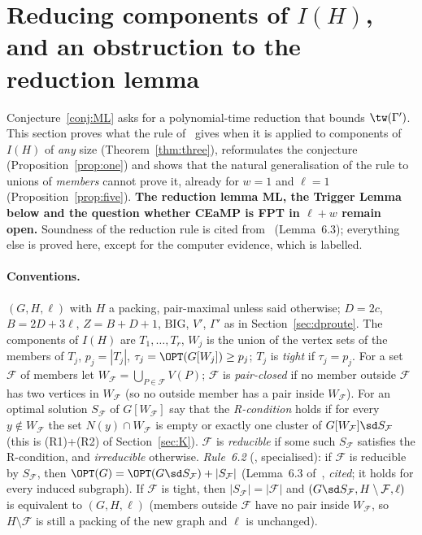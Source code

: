 \section{Reducing components of \texorpdfstring{$I(H)$}{I(H)}, and an obstruction to the reduction lemma}\label{sec:reduction}
Conjecture~\ref{conj:ML} asks for a polynomial-time reduction that bounds $\tw(\Gamma')$. This section proves what the rule of~\cite{BFK18} gives when it is applied to components of $I(H)$ of \emph{any} size (Theorem~\ref{thm:three}), reformulates the conjecture (Proposition~\ref{prop:one}) and shows that the natural generalisation of the rule to unions of \emph{members} cannot prove it, already for $w=1$ and $\ell=1$ (Proposition~\ref{prop:five}). \textbf{The reduction lemma ML, the Trigger Lemma below and the question whether CEaMP is FPT in $\ell+w$ remain open.} Soundness of the reduction rule is cited from~\cite{BFK18} (Lemma~6.3); everything else is proved here, except for the computer evidence, which is labelled.

\paragraph{Conventions.}
$(G,H,\ell)$ with $H$ a packing, pair-maximal unless said otherwise; $D=2c$, $B=2D+3\ell$, $Z=B+D+1$, $\mathrm{BIG}$, $V'$, $\Gamma'$ as in Section~\ref{sec:dproute}. The components of $I(H)$ are $T_1,\dots,T_r$, $W_j$ is the union of the vertex sets of the members of $T_j$, $p_j=|T_j|$, $\tau_j=\OPT(G[W_j])\ge p_j$; $T_j$ is \emph{tight} if $\tau_j=p_j$. For a set $\mathcal F$ of members let $W_{\mathcal F}=\bigcup_{P\in\mathcal F}V(P)$; $\mathcal F$ is \emph{pair-closed} if no member outside $\mathcal F$ has two vertices in $W_{\mathcal F}$ (so no outside member has a pair inside $W_{\mathcal F}$). For an optimal solution $S_{\mathcal F}$ of $G[W_{\mathcal F}]$ say that the \emph{R-condition} holds if for every $y\notin W_{\mathcal F}$ the set $N(y)\cap W_{\mathcal F}$ is empty or exactly one cluster of $G[W_{\mathcal F}]\sd S_{\mathcal F}$ (this is (R1)+(R2) of Section~\ref{sec:K}). $\mathcal F$ is \emph{reducible} if some such $S_{\mathcal F}$ satisfies the R-condition, and \emph{irreducible} otherwise. \emph{Rule~6.2} (\cite{BFK18}, specialised): if $\mathcal F$ is reducible by $S_{\mathcal F}$, then $\OPT(G)=\OPT(G\sd S_{\mathcal F})+|S_{\mathcal F}|$ (Lemma~6.3 of~\cite{BFK18}, \emph{cited}; it holds for every induced subgraph). If $\mathcal F$ is tight, then $|S_{\mathcal F}|=|\mathcal F|$ and $(G\sd S_{\mathcal F},H\setminus\mathcal F,\ell)$ is equivalent to $(G,H,\ell)$ (members outside $\mathcal F$ have no pair inside $W_{\mathcal F}$, so $H\setminus\mathcal F$ is still a packing of the new graph and $\ell$ is unchanged).

